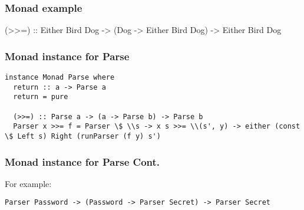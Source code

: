\documentclass{beamer}
\begin{document}
\begin{frame}
\frametitle{Monad example}
(>>=) :: Either Bird Dog -> (Dog -> Either Bird Dog) -> Either Bird Dog

%
%
%
%
\end{frame}


\begin{frame}
\frametitle{Monad instance for Parse}


\begin{lstlisting}[frame=single]
instance Monad Parse where
  return :: a -> Parse a
  return = pure

  (>>=) :: Parse a -> (a -> Parse b) -> Parse b
  Parser x >>= f = Parser \$ \\s -> x s >>= \\(s', y) -> either (const \$ Left s) Right (runParser (f y) s')
\end{lstlisting}

\end{frame}


\begin{frame}
\frametitle{Monad instance for Parse Cont.}
For example:

\begin{lstlisting}[frame=single]
Parser Password -> (Password -> Parser Secret) -> Parser Secret
\end{lstlisting}

%
%
%
%
\end{frame}
\end{document}
